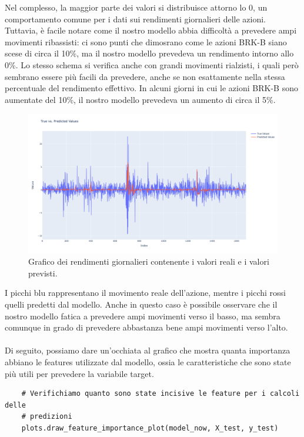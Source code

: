 \documentclass{article}
\begin{document}
Nel complesso, la maggior parte dei valori si distribuisce attorno lo 0, un comportamento comune per i dati sui rendimenti giornalieri delle azioni. Tuttavia, è facile notare come il nostro modello abbia difficoltà a prevedere ampi movimenti ribassisti: ci sono punti che dimosrano come le azioni BRK-B siano scese di circa il 10\%, ma il nostro modello prevedeva un rendimento intorno allo 0\%. Lo stesso schema si verifica anche con grandi movimenti rialzisti, i quali però sembrano essere più facili da prevedere, anche se non esattamente nella stessa percentuale del rendimento effettivo. In alcuni giorni in cui le azioni BRK-B sono aumentate del 10\%, il nostro modello prevedeva un aumento di circa il 5\%.
\begin{figure}[H]
\centering
\includegraphics[width=1\linewidth]{newplot.png}
\caption{\label{fig:frequency_plot}Grafico dei rendimenti giornalieri contenente i valori reali e i valori previsti.} 
\end{figure}
I picchi blu rappresentano il movimento reale dell'azione, mentre i picchi rossi quelli predetti dal modello. Anche in questo caso è possibile osservare che il nostro modello fatica a prevedere ampi movimenti verso il basso, ma sembra comunque in grado di prevedere abbastanza bene ampi movimenti verso l’alto. 
\\ \\
Di seguito, possiamo dare un'occhiata al grafico che mostra quanta importanza abbiano le features utilizzate dal modello, ossia le caratteristiche che sono state più utili per prevedere la variabile target.
\begin{verbatim} 
    # Verifichiamo quanto sono state incisive le feature per i calcoli delle 
    # predizioni
    plots.draw_feature_importance_plot(model_now, X_test, y_test)
\end{verbatim}
\end{document}
